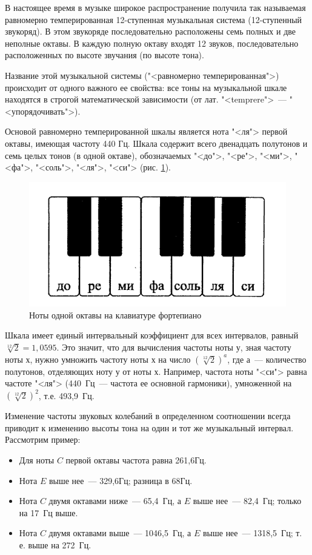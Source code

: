 \documentclass[oneside, final, 14pt]{extreport}
\begin{document}
В настоящее время в музыке широкое распространение получила так называемая равномерно темперированная 12-ступенная музыкальная система (12-ступенный звукоряд). В этом звукоряде последовательно расположены семь полных и две неполные октавы. В каждую полную октаву входят 12 звуков, последовательно расположенных по высоте звучания (по высоте тона).

Название этой музыкальной системы ("<равномерно темперированная">) происходит от одного важного ее свойства: все тоны на музыкальной шкале находятся в строгой математической зависимости (от лат. "<temprere">~--- "<упорядочивать">).

Основой равномерно темперированной шкалы является нота "<ля"> первой октавы, имеющая частоту 440 Гц. Шкала содержит всего двенадцать полутонов и семь целых тонов (в одной октаве), обозначаемых "<до">, "<ре">, "<ми">, "<фа">, "<соль">, "<ля">, "<си"> (рис. \ref{pic-ear-18}).

\begin{figure}[h]
\centering
\includegraphics[scale=0.8]{pic-ear-18}
\caption{Ноты одной октавы на клавиатуре фортепиано}
\label{pic-ear-18}
\end{figure}

Шкала имеет единый интервальный коэффициент для всех интервалов, равный $\sqrt[12]{2} = 1,0595$. Это значит, что для вычисления частоты ноты $у$, зная частоту ноты $х$,
нужно умножить частоту ноты $х$ на число $(\sqrt[12]{2})^a$, где $а$~--- количество полутонов, отделяющих ноту $у$ от ноты $х$. Например, частота ноты "<си">  равна частоте "<ля"> (440~Гц~--- частота ее основной гармоники), умноженной на $(\sqrt[12]{2})^2$, т.е. 493,9~Гц.

Изменение частоты звуковых колебаний в определенном соотношении всегда приводит к изменению высоты тона на один и тот же музыкальный интервал. Рассмотрим пример: 
\begin{itemize}
\item Для ноты $C$ первой октавы частота равна 261,6Гц. 
\item Нота $E$ выше нее~--- 329,6Гц; разница в 68Гц.
\item Нота $C$ двумя октавами ниже~--- 65,4~Гц, а $E$ выше нее~--- 82,4~Гц; только на 17~Гц выше. 
\item Нота $C$ двумя октавами выше~--- 1046,5~Гц, а $E$ выше нее~--- 1318,5~Гц; т. е. выше на 272~Гц.
\end{itemize}
\end{document}
